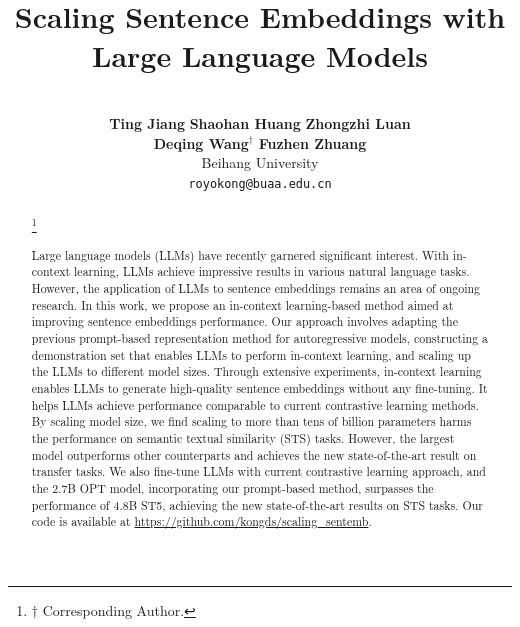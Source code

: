 \documentclass{article}
\title{Scaling Sentence Embeddings with \\ Large Language Models}
\author{
\vspace{-0.25in} \\
\textbf{Ting Jiang} \quad \textbf{Shaohan Huang} \quad \textbf{Zhongzhi Luan}\\
\textbf{Deqing Wang$^\dagger$} \quad \textbf{Fuzhen Zhuang} \\
Beihang University\\%
 \texttt{royokong@buaa.edu.cn}
\vspace{-0.4cm}
\\}
\date{}
\newcommand\blfootnote[1]{%
\begingroup
\renewcommand\thefootnote{}\footnote{#1}%
\addtocounter{footnote}{-1}%
\endgroup
}
\begin{document}
\maketitle


\begin{abstract}
 \blfootnote{ $\dagger$ Corresponding Author.}
Large language models (LLMs) have recently garnered significant interest. With in-context learning, LLMs achieve impressive results in various natural language tasks.
However, the application of LLMs to sentence embeddings remains an area of ongoing research.
In this work, we propose an in-context learning-based method aimed at improving sentence embeddings performance.
Our approach involves adapting the previous prompt-based representation method for autoregressive models, constructing a demonstration set that enables LLMs to perform in-context learning, and scaling up the LLMs to different model sizes.
Through extensive experiments, in-context learning enables LLMs to generate high-quality sentence embeddings without any fine-tuning. It helps LLMs achieve performance comparable to current contrastive learning methods.
By scaling model size,
we find scaling to more than tens of billion parameters harms the performance on semantic textual similarity (STS) tasks.
However, the largest model outperforms other counterparts and achieves the new state-of-the-art result on transfer tasks.
We also fine-tune LLMs with current contrastive learning approach, and the 2.7B OPT model, incorporating our prompt-based method, surpasses the performance of 4.8B ST5, achieving the new state-of-the-art results on STS tasks.
Our code is available at \url{https://github.com/kongds/scaling_sentemb}.


\end{abstract}
\end{document}

